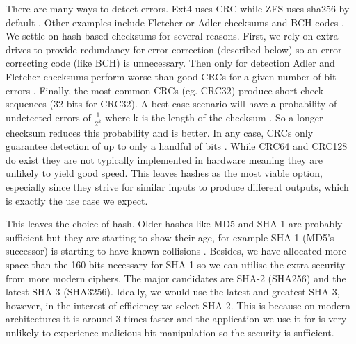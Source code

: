         There are many ways to detect errors. Ext4 uses CRC \cite{ext4_docs}
        while ZFS uses sha256 by default \cite{ZFS_docs}. Other examples
        include Fletcher or Adler checksums \cite{embedded_checksums} and BCH
        codes \cite{flash_error_manual}. We settle on hash based checksums for
        several reasons. First, we rely on extra drives to provide redundancy
        for error correction (described below) so an error correcting code
        (like BCH) is unnecessary. Then only for detection Adler and Fletcher
        checksums perform worse than good CRCs for a given number of bit errors
        . Finally, the most common CRCs (eg.
        CRC32) produce short check sequences (32 bits for CRC32). A best case
        scenario will have a probability of undetected errors of
        $\frac{1}{2^k}$ where k is the length of the checksum
        \cite{embedded_checksums}. So a longer checksum reduces this
        probability and is better. In any case, CRCs only guarantee detection
        of up to only a handful of bits \cite{embedded_checksums}. While CRC64
        and CRC128 do exist they are not typically implemented in hardware
        meaning they are unlikely to yield good speed. This leaves hashes as
        the most viable option, especially since they strive for similar inputs
        to produce different outputs, which is exactly the use case we expect.

        This leaves the choice of hash. Older hashes like MD5 and SHA-1
        \cite{sha1} are probably sufficient but they are starting to show their
        age, for example SHA-1 (MD5's successor) is starting to have known
        collisions \cite{SHA_collision}. Besides, we have allocated more space
        than the 160 bits necessary for SHA-1 so we can utilise the extra
        security from more modern ciphers. The major candidates are SHA-2
        \cite{sha2_analysis} (SHA256) and the latest SHA-3 \cite{sha3}
        (SHA3256). Ideally, we would use the latest and greatest SHA-3, however,
        in the interest of efficiency we select SHA-2.  This is because on
        modern architectures it is around 3 times faster \cite{hash_stats} and
        the application we use it for is very unlikely to experience malicious
        bit manipulation so the security is sufficient.

